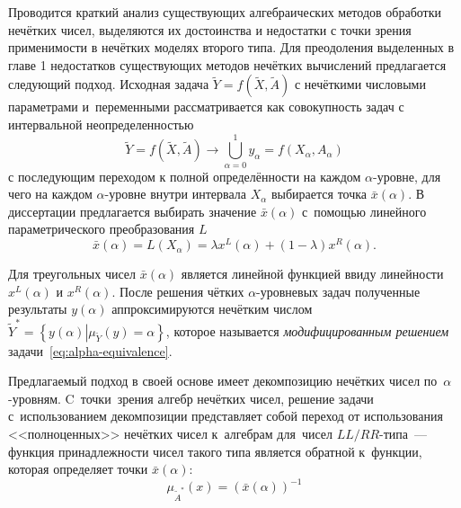 Проводится краткий анализ существующих алгебраических методов обработки нечётких чисел, выделяются их достоинства и недостатки с точки зрения применимости в нечётких моделях второго типа. Для преодоления выделенных в главе 1 недостатков существующих методов нечётких вычислений предлагается следующий подход. Исходная задача $\tilde{Y}=f\left( \tilde{X}, \tilde A \right)$ с нечёткими числовыми параметрами и~переменными рассматривается как совокупность задач с интервальной неопределенностью
\begin{equation}
\label{eq:alpha-equivalence}
	\tilde{Y} = f\left( \tilde X, \tilde A \right)\to \bigcup\limits_{\alpha =0}^{1}{y_\alpha}=f\left( X_\alpha, A_\alpha \right)
\end{equation}
с последующим переходом к полной определённости на каждом $\alpha$-уровне, для чего на каждом $\alpha$-уровне внутри интервала $X_\alpha$ выбирается точка $\bar{x}\left( \alpha  \right)$. В диссертации предлагается выбирать значение $\bar{x}\left( \alpha  \right)$ с~помощью линейного параметрического преобразования $L$
\begin{equation}
  \label{eq:L-transform-base}
  \bar{x}\left( \alpha  \right)=L\left( X_\alpha \right)=\lambda x^L \left( \alpha  \right)+\left( 1-\lambda  \right) x^R \left( \alpha  \right).
\end{equation}

Для треугольных чисел $\bar{x}\left( \alpha  \right)$ является линейной функцией ввиду линейности $x^L\left( \alpha  \right)$ и $x^R\left( \alpha  \right)$. После решения чётких $\alpha $-уровневых задач полученные результаты $y\left( \alpha  \right)$ аппроксимируются нечётким числом $\tilde Y^{*}=\left\{ y(\alpha )\left| \mu_{\tilde Y}(y)=\alpha \right. \right\}$, которое называется \textit{модифицированным решением} задачи~\eqref{eq:alpha-equivalence}.

Предлагаемый подход в своей основе имеет декомпозицию нечётких чисел по~$\alpha$-уровням. C~точки~зрения алгебр нечётких чисел, решение задачи с~использованием декомпозиции представляет собой переход от использования <<полноценных>> нечётких чисел к~алгебрам для~чисел $LL/RR$-типа~--- функция принадлежности чисел такого типа является обратной к~функции, которая определяет точки $\bar{x}\left(\alpha \right)$:
\begin{equation}
\label{eq:modified-inverse-function}
  \mu_{\tilde A^{*}}\left( x \right)={\left( \bar{x}\left( \alpha  \right) \right)}^{-1}
\end{equation}

